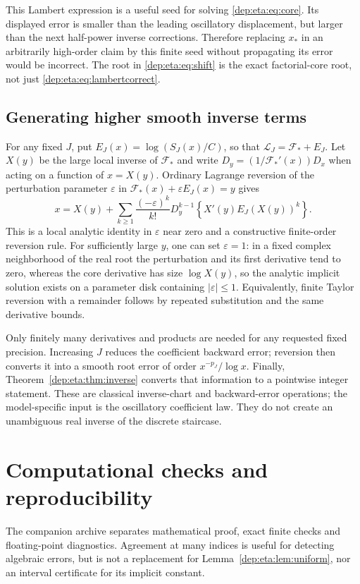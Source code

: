 \documentclass[11pt]{article}
\theoremstyle{definition}\newtheorem{definition}[theorem]{Definition}
\theoremstyle{remark}\newtheorem{remark}[theorem]{Remark}
\begin{document}
This Lambert expression is a useful seed for solving
\eqref{dep:eta:eq:core}. Its displayed error is smaller than the leading
oscillatory displacement, but larger than the next half-power inverse
corrections. Therefore replacing $x_*$ in an arbitrarily high-order
claim by this finite seed without propagating its error would be
incorrect. The root in \eqref{dep:eta:eq:shift} is the exact factorial-core
root, not just \eqref{dep:eta:eq:lambertcorrect}.

\subsection{Generating higher smooth inverse terms}
For any fixed $J$, put $E_J(x)=\log(S_J(x)/C)$, so that
$\mathcal L_J=\mathcal F_*+E_J$. Let $X(y)$ be the large local
inverse of $\mathcal F_*$ and write $D_y=(1/\mathcal F_*'(x))D_x$
when acting on a function of $x=X(y)$. Ordinary Lagrange reversion
of the perturbation parameter $\varepsilon$ in
$\mathcal F_*(x)+\varepsilon E_J(x)=y$ gives
\begin{equation}\label{dep:eta:eq:reversion}
 x=X(y)+\sum_{k\ge1}\frac{(-\varepsilon)^k}{k!}
     D_y^{k-1}\left\{X'(y)E_J(X(y))^k\right\}.
\end{equation}
This is a local analytic identity in $\varepsilon$ near zero and a
constructive finite-order reversion rule. For sufficiently large
$y$, one can set $\varepsilon=1$: in a fixed complex neighborhood
of the real root the perturbation and its first derivative tend to
zero, whereas the core derivative has size $\log X(y)$, so the
analytic implicit solution exists on a parameter disk containing
$|\varepsilon|\le1$. Equivalently, finite Taylor reversion with a
remainder follows by repeated substitution and the same derivative
bounds.

Only finitely many derivatives and products are needed for any
requested fixed precision. Increasing $J$ reduces the coefficient
backward error; reversion then converts it into a smooth root error
of order $x^{-p_J}/\log x$. Finally, Theorem~\ref{dep:eta:thm:inverse}
converts that information to a pointwise integer statement. These are
classical inverse-chart and backward-error operations; the
model-specific input is the oscillatory coefficient law. They do not
create an unambiguous real inverse of the discrete staircase.

\section{Computational checks and reproducibility}\label{dep:eta:sec:computations}
The companion archive separates mathematical proof, exact finite
checks and floating-point diagnostics. Agreement at many indices is
useful for detecting algebraic errors, but is not a replacement for
Lemma~\ref{dep:eta:lem:uniform}, nor an interval certificate for its implicit
constant.
\end{document}
